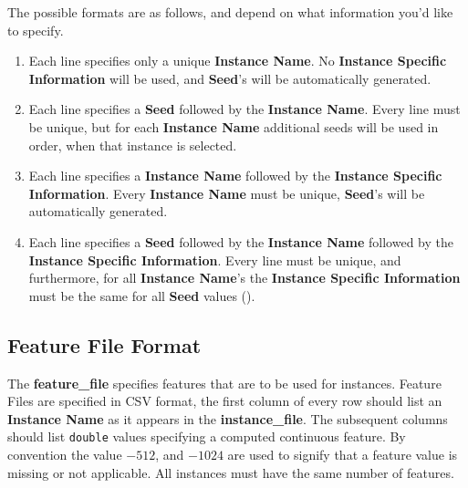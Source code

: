 \documentclass[manual.tex]{subfiles}
\begin{document}
The possible formats are as follows, and depend on what information you'd like to specify.

\begin{enumerate}
\item	Each line specifies only a unique \textbf{Instance Name}. No \textbf{Instance Specific Information} will be used, and \textbf{Seed}'s will be automatically generated.

\item  Each line specifies a \textbf{Seed} followed by the \textbf{Instance Name}. Every line must be unique, but for each \textbf{Instance Name} additional seeds will be used in order, when that instance is selected.

\item Each line specifies a \textbf{Instance Name} followed by the \textbf{Instance Specific Information}. Every \textbf{Instance Name} must be unique, \textbf{Seed}'s will be automatically generated.

\item Each line specifies a \textbf{Seed} followed by the \textbf{Instance Name} followed by the \textbf{Instance Specific Information}. Every line must be unique, and furthermore, for all \textbf{Instance Name}'s the \textbf{Instance Specific Information} must be the same for all \textbf{Seed} values ().

\end{enumerate}

\subsection{Feature File Format}\label{sec:feature_file_format}



The \textbf{feature\_file} specifies features that are to be used for instances. Feature Files are specified in CSV format, the first column of every row should list an \textbf{Instance Name} as it appears in the \textbf{instance\_file}. The subsequent columns should list \texttt{double} values specifying a computed continuous feature. By convention the value $-512$, and $-1024$ are used to signify that a feature value is missing or not applicable. All instances must have the same number of features.
\end{document}

